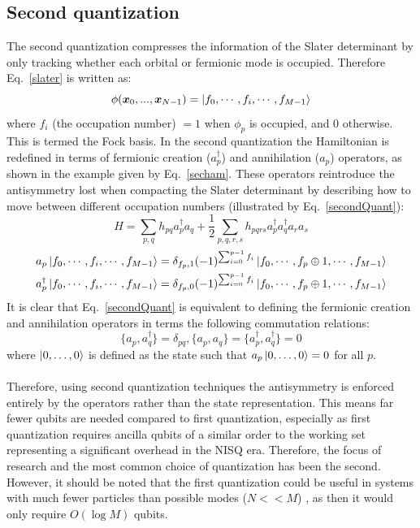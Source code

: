 \documentclass[twoside]{article}
\begin{document}
\subsection{Second quantization} \label{secondquantization}
The second quantization compresses the information of the Slater determinant by only tracking whether each orbital or fermionic mode is occupied. Therefore Eq.~\ref{slater} is written as:
\begin{equation}
        \phi(\bm x_0, ..., \bm x_{N-1}) = \ket{f_0,\cdots, f_i, \cdots, f_{M-1}}
\end{equation}
where $f_i$ (the occupation number) $ =1$ when $\phi_p$ is occupied, and 0 otherwise. This is termed the Fock basis. In the second quantization the Hamiltonian is redefined in terms of fermionic creation ($a^{\dagger}_p$) and annihilation ($a_p$) operators, as shown in the example given by Eq.~\ref{secham}. These operators reintroduce the antisymmetry lost when compacting the Slater determinant by describing how to move between different occupation numbers \cite{chemistryReview} (illustrated by Eq.~\ref{secondQuant}):
\begin{equation}
        \label{secham}
        H = \sum_{p,q} h_{pq}a_p^{\dagger} a_q + \frac{1}{2}\sum_{p,q,r,s} h_{pqrs} a_p^{\dagger} a^{\dagger}_q a_r a_s
\end{equation}
\begin{equation}
        \label{secondQuant}
        \begin{align}
        a_p \ket{f_0,\cdots, f_i, \cdots, f_{M-1}} = \delta_{f_p, 1} (-1)^{\sum_{i=0}^{p-1} f_i} \ket{f_0,\cdots, f_p \oplus 1, \cdots, f_{M-1}}\\
        a_p^{\dagger} \ket{f_0,\cdots, f_i, \cdots, f_{M-1}} = \delta_{f_p, 0} (-1)^{\sum_{i=0}^{p-1} f_i} \ket{f_0,\cdots, f_p \oplus 1, \cdots, f_{M-1}}
\end{align}
\end{equation}
It is clear that Eq.~\ref{secondQuant} is equivalent to defining the fermionic creation and annihilation operators in terms the following commutation relations:
\begin{equation}
        \{ a_p, a_q^{\dagger}\} = \delta_{pq}, \{ a_p, a_q \} =  \{a^{\dagger}_p, a^{\dagger}_q\} = 0
\end{equation}
where $\ket{0,\ldots,0}$ is defined as the state such that $a_p \ket{0,\ldots,0} = 0$ for all $p$.\\\\
Therefore, using second quantization techniques the antisymmetry is enforced entirely by the operators rather than the state representation. This means far fewer qubits are needed compared to first quantization, especially as first quantization requires ancilla qubits of a similar order to the working set representing a significant overhead in the NISQ era. Therefore, the focus of research and the most common choice of quantization has been the second. However, it should be noted that the first quantization could be useful in systems with much fewer particles than possible modes ($N<<M$) \cite{tilly}, as then it would only require $O(\log M)$ qubits. 
\end{document}
